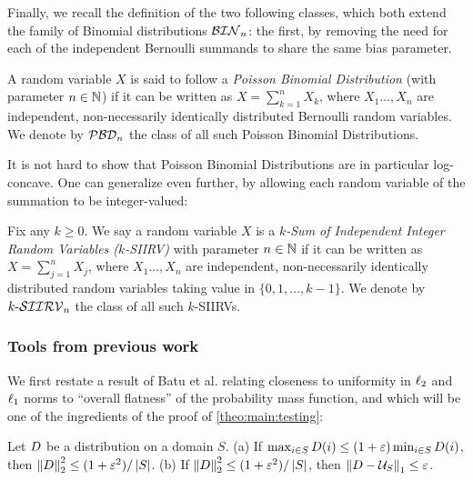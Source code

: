 Finally, we recall the definition of the two following classes, which both extend the family of Binomial distributions $\classbin_n$: the first, by removing the need for each of the independent Bernoulli summands to share the same bias parameter.
\begin{definition}\label{def:pbd}
A random variable $X$ is said to follow a \emph{Poisson Binomial Distribution} (with parameter $n\in\N$) if it can be written as $X=\sum_{k=1}^n X_k$, where $X_1\dots,X_n$ are independent, non-necessarily identically distributed Bernoulli random variables. We denote by $\classpbd_n$ the class of all such Poisson Binomial Distributions.
\end{definition}
\noindent It is not hard to show that Poisson Binomial Distributions are in particular log-concave. One can generalize even further, by allowing each random variable of the summation to be integer-valued:
\begin{definition}\label{def:siirv}
Fix any $k\geq 0$. We say a random variable $X$ is a \emph{$k$-Sum of Independent Integer Random Variables ($k$-SIIRV)} with parameter $n\in\N$ if it can be written as $X=\sum_{j=1}^n X_j$, where $X_1\dots,X_n$ are independent, non-necessarily identically distributed random variables taking value in $\{0,1,\dots,k-1\}$. We denote by $\classksiirv_n$ the class of all such $k$-SIIRVs.
\end{definition}

\subsubsection{Tools from previous work}

We first restate a result of Batu et al. relating closeness to uniformity in $\lp[2]$ and $\lp[1]$ norms to ``overall flatness'' of the probability mass function, and which will be one of the ingredients of the proof of \cref{theo:main:testing}:

\begin{lemma}\label{lemma:small:l2:close:uniform:l1}
Let $\D$ be a distribution on a domain $S$. \textsf{(a)} If $\max_{i\in S} \D(i) \leq (1+\eps)\min_{i\in S} \D(i)$, then $\normtwo{\D}^2 \leq (1+\eps^2)/\abs{S}$. \textsf{(b)} If $\normtwo{\D}^2 \leq (1+\eps^2)/\abs{S}$, then $\normone{\D-\uniform_{S}} \leq \eps$.
\end{lemma}

